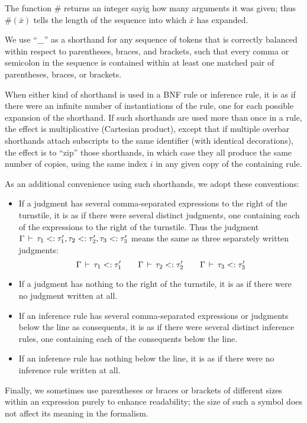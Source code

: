 The function $\#$ returns an integer sayig how many arguments it was given; thus $\#(\bar{x})$ tells the length of the sequence into which $\bar{x}$ has expanded.

We use ``$\dontcare$'' as a shorthand for any sequence of tokens that is correctly balanced within respect to parentheses, braces, and brackets,
such that every comma or semicolon in the sequence is contained within at least one matched pair of parentheses, braces, or brackets.

When either kind of shorthand is used in a BNF rule or inference rule, it is as if there were an infinite number of instantiations of the rule,
one for each possible expansion of the shorthand.  If such shorthands are used more than once in a rule, the effect is multiplicative (Cartesian product), except that
if multiple overbar shorthands attach subscripts to the same identifier (with identical decorations), the effect is to ``zip'' those shorthands, in which case they all
produce the same number of copies, using the same index $i$ in any given copy of the containing rule.

As an additional convenience using such shorthands, we adopt these conventions:
\begin{itemize}
\item If a judgment has several comma-separated expressions to the right of the turnstile, it is
as if there were several distinct judgments, one containing each of the expressions to the right of the turnstile.
Thus the judgment $\jgTHREEtemplate{\Gamma}{\tau_1}{\extends}{\tau'_1}{\tau_2}{\tau'_2}{\tau_3}{\tau'_3}$
means the same as three separately written judgments:
\[\jgtemplate[\Gamma]{\tau_1}{\extends}{\tau'_1} \andalso \jgtemplate[\Gamma]{\tau_2}{\extends}{\tau'_2} \andalso \jgtemplate[\Gamma]{\tau_3}{\extends}{\tau'_3} \]
\item If a judgment has nothing to the right of the turnstile, it is
as if there were no judgment written at all.
\item If an inference rule has several comma-separated expressions or judgments below the line as consequents, it is
as if there were several distinct inference rules, one containing each of the consequents below the line.
\item If an inference rule has nothing below the line, it is
as if there were no inference rule written at all.
\end{itemize}

Finally, we sometimes use parentheses or braces or brackets of different sizes within an expression purely to enhance readability;
the size of such a symbol does not affect its meaning in the formalism.
